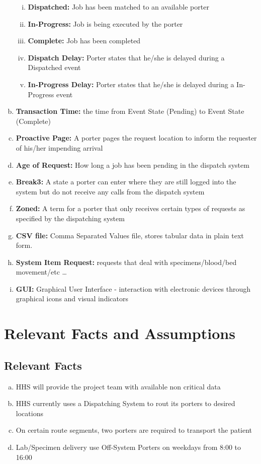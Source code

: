\documentclass[paper=letter, fontsize=10pt]{scrartcl}
\numberwithin{equation}{section}		%
\numberwithin{figure}{section}			%
\numberwithin{table}{section}				%
\begin{document}
\begin{enumerate}[(a)]
\begin{enumerate}[(i)]
		\item \textbf{Dispatched:} Job has been matched to an available porter
		\item \textbf{In-Progress:} Job is being executed by the porter
		\item \textbf{Complete:} Job has been completed
		\item \textbf{Dispatch Delay:} Porter states that he/she is delayed during a Dispatched event
		\item \textbf{In-Progress Delay:} Porter states that he/she is delayed during a In-Progress event
	\end{enumerate} 
	\item \textbf{Transaction Time:} the time from Event State (Pending) to Event State (Complete)
	\item \textbf{Proactive Page:} A porter pages the request location to inform the requester of his/her impending arrival      
	\item \textbf{Age of Request:} How long a job has been pending in the dispatch system
	\item \textbf{Break3:} A state a porter can enter where they are still logged into the system but do not receive any calls from the dispatch system
	\item \textbf{Zoned:} A term for a porter that only receives certain types of requests as specified by the dispatching system 
	\item \textbf{CSV file:} Comma Separated Values file, stores tabular data in plain text form. 
	\item \textbf{System Item Request:} requests that deal with specimens/blood/bed movement/etc \ldots
	\item \textbf{GUI:} Graphical User Interface - interaction with electronic devices through graphical icons and visual indicators
\end{enumerate}

\section{Relevant Facts and Assumptions}
\subsection{Relevant Facts}
\begin{enumerate}[(a)]
	\item HHS will provide the project team with available non critical data
	\item HHS currently uses a Dispatching System to rout its porters to desired locations
	\item On certain route segments, two porters are required to transport the patient 
	\item Lab/Specimen delivery use Off-System Porters on weekdays from 8:00 to 16:00
\end{enumerate}
\end{document}
